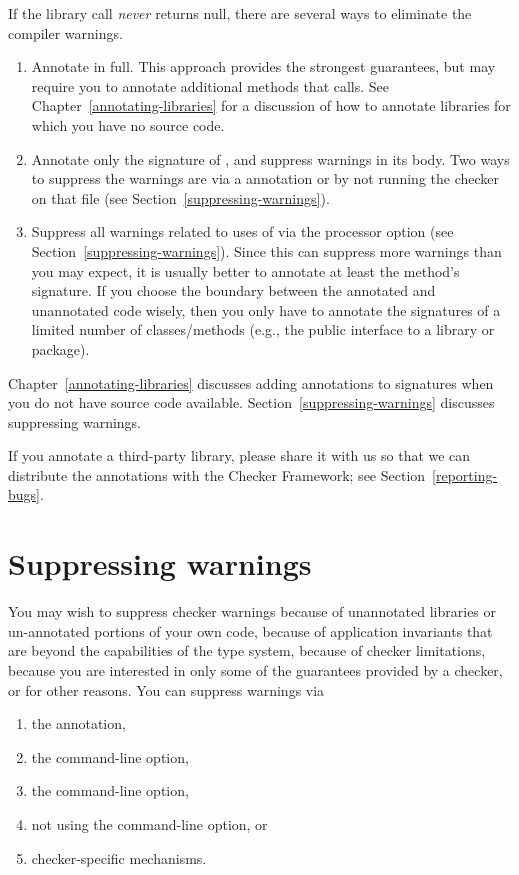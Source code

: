 If the library call \emph{never} returns null,
there are several ways to eliminate the compiler warnings.
\begin{enumerate}
\item Annotate  in full.  This approach provides
  the strongest guarantees, but may require you to annotate additional
  methods that  calls.  See
  Chapter~\ref{annotating-libraries} for a discussion of how to annotate
  libraries for which you have no source code.
\item Annotate only the signature of , and
  suppress warnings in its body.  Two ways to suppress the warnings are via a
   annotation or by not running the checker on that
  file (see Section~\ref{suppressing-warnings}).
\item Suppress all warnings related to uses of 
  via the  processor option
  (see Section~\ref{suppressing-warnings}).
  Since this can suppress more warnings than you may expect,
  it is usually better to annotate at least the method's signature.  If you
  choose the boundary between the annotated and unannotated code wisely,
  then you only have to annotate the signatures of a limited number of
  classes/methods
  (e.g., the public interface to a library or package).

\end{enumerate}

Chapter~\ref{annotating-libraries} discusses adding annotations to
signatures when you do not have source code available.
Section~\ref{suppressing-warnings} discusses suppressing warnings.


If you annotate a third-party library, please share it with us so that we
can distribute the annotations with the Checker Framework; see
Section~\ref{reporting-bugs}.


\section{Suppressing warnings\label{suppressing-warnings}}

You may wish to suppress checker warnings because of unannotated libraries
or un-annotated portions of your own code, because of application
invariants that are beyond the capabilities of the type system, because of
checker limitations, because you are interested in only some of the
guarantees provided by a checker, or for other reasons.  You can suppress
warnings via
\begin{enumerate}
\item
  the  annotation,
\item
  the  command-line option,
\item
  the  command-line option,
\item
  not using the  command-line option, or
\item
  checker-specific mechanisms.
\end{enumerate}

